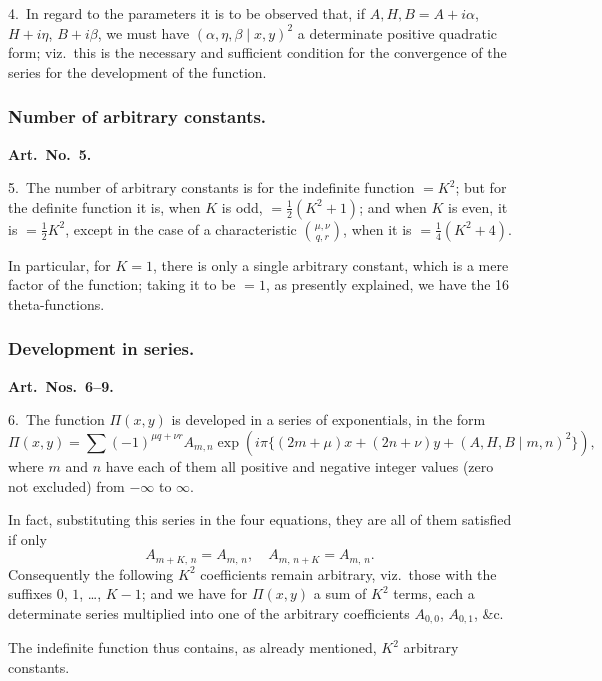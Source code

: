 \documentclass[11pt,a4paper]{article}
\theoremstyle{definition}
\begin{document}
\medskip

4.\ In regard to the parameters it is to be observed that, if $A, H, B = A + i\alpha$, $H + i\eta$, $B + i\beta$, we must have $(\alpha, \eta, \beta \mid x, y)^2$ a determinate positive quadratic form; viz.\ this is the necessary and sufficient condition for the convergence of the series for the development of the function.

\subsubsection*{Number of arbitrary constants.}

\textbf{Art.~No.~5.}

5.\ The number of arbitrary constants is for the indefinite function $= K^2$; but for the definite function it is, when $K$ is odd, $= \frac{1}{2}(K^2 + 1)$; and when $K$ is even, it is $= \frac{1}{2}K^2$, except in the case of a characteristic $\binom{\mu, \nu}{q, r}$, when it is $= \frac{1}{4}(K^2 + 4)$.

In particular, for $K = 1$, there is only a single arbitrary constant, which is a mere factor of the function; taking it to be $= 1$, as presently explained, we have the 16 theta-functions.

\subsubsection*{Development in series.}

\textbf{Art.~Nos.~6--9.}

6.\ The function $\Pi(x, y)$ is developed in a series of exponentials, in the form
\[
\Pi(x, y) = \sum (-1)^{\mu q + \nu r}A_{m,n}\exp(i\pi\{(2m + \mu)x + (2n + \nu)y + (A, H, B \mid m, n)^2\}),
\]
where $m$ and $n$ have each of them all positive and negative integer values (zero not excluded) from $-\infty$ to $\infty$.

In fact, substituting this series in the four equations, they are all of them satisfied if only
\[
A_{m+K,\,n} = A_{m,\,n}, \quad A_{m,\,n+K} = A_{m,\,n}.
\]
Consequently the following $K^2$ coefficients remain arbitrary, viz.\ those with the suffixes $0$, $1$, \ldots, $K-1$; and we have for $\Pi(x, y)$ a sum of $K^2$ terms, each a determinate series multiplied into one of the arbitrary coefficients $A_{0,0}$, $A_{0,1}$, \&c.

The indefinite function thus contains, as already mentioned, $K^2$ arbitrary constants.

\medskip
\end{document}
